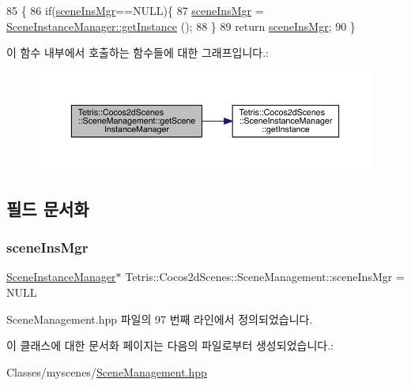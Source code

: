 \begin{DoxyCode}
85                                                        \{
86             \textcolor{keywordflow}{if}(\hyperlink{class_tetris_1_1_cocos2d_scenes_1_1_scene_management_a0ac07876072adcaefdcb86f9911475ba}{sceneInsMgr}==NULL)\{
87                 \hyperlink{class_tetris_1_1_cocos2d_scenes_1_1_scene_management_a0ac07876072adcaefdcb86f9911475ba}{sceneInsMgr} = \hyperlink{class_tetris_1_1_cocos2d_scenes_1_1_scene_instance_manager_a0010e1efc6470cde661494631dc35b90}{SceneInstanceManager::getInstance}
      ();
88             \}
89             \textcolor{keywordflow}{return} \hyperlink{class_tetris_1_1_cocos2d_scenes_1_1_scene_management_a0ac07876072adcaefdcb86f9911475ba}{sceneInsMgr};
90         \}
\end{DoxyCode}
이 함수 내부에서 호출하는 함수들에 대한 그래프입니다.\+:
\nopagebreak
\begin{figure}[H]
\begin{center}
\leavevmode
\includegraphics[width=350pt]{db/d41/class_tetris_1_1_cocos2d_scenes_1_1_scene_management_a4a4ea58177afffd49857182c961eb5f3_cgraph}
\end{center}
\end{figure}


\subsection{필드 문서화}
\mbox{\label{class_tetris_1_1_cocos2d_scenes_1_1_scene_management_a0ac07876072adcaefdcb86f9911475ba}} 
\subsubsection{\texorpdfstring{scene\+Ins\+Mgr}{sceneInsMgr}}
{\footnotesize\ttfamily \hyperlink{class_tetris_1_1_cocos2d_scenes_1_1_scene_instance_manager}{Scene\+Instance\+Manager}$\ast$ Tetris\+::\+Cocos2d\+Scenes\+::\+Scene\+Management\+::scene\+Ins\+Mgr = N\+U\+LL\hspace{0.3cm}{\ttfamily [protected]}}



Scene\+Management.\+hpp 파일의 97 번째 라인에서 정의되었습니다.



이 클래스에 대한 문서화 페이지는 다음의 파일로부터 생성되었습니다.\+:\begin{DoxyCompactItemize}
\item 
Classes/myscenes/\hyperlink{_scene_management_8hpp}{Scene\+Management.\+hpp}\end{DoxyCompactItemize}
